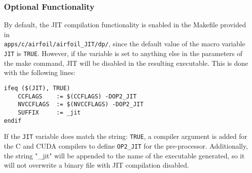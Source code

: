 \subsubsection{Optional Functionality}
By default, the JIT compilation functionality is enabled in the Makefile provided in \\\verb|apps/c/airfoil/airfoil_JIT/dp/|, since the default value of the macro variable \verb|JIT| is \verb|TRUE|. However, if the variable is set to anything else in the parameters of the make command, JIT will be disabled in the resulting executable. This is done with the following lines:
\begin{lstlisting}[linewidth = \textwidth, framesep=0pt]
ifeq ($(JIT), TRUE)
	CCFLAGS    := $(CCFLAGS) -DOP2_JIT
	NVCCFLAGS  := $(NVCCFLAGS) -DOP2_JIT
	SUFFIX     := _jit
endif
\end{lstlisting}
If the \verb|JIT| variable does match the string: \verb|TRUE|, a compiler argument is added for the C and CUDA compilers to define \verb|OP2_JIT| for the pre-processor. Additionally, the string "\_jit" will be appended to the name of the executable generated, so it will not overwrite a binary file with JIT compilation disabled.
